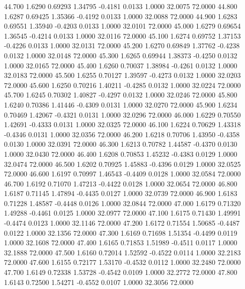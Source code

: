   44.700   1.6290   0.69293   1.34795  -0.4181   0.0133   1.0000  32.0075  72.0000
  44.800   1.6287   0.69425   1.35366  -0.4192   0.0133   1.0000  32.0088  72.0000
  44.900   1.6283   0.69551   1.35940  -0.4203   0.0133   1.0000  32.0101  72.0000
  45.000   1.6279   0.69654   1.36545  -0.4214   0.0133   1.0000  32.0116  72.0000
  45.100   1.6274   0.69752   1.37153  -0.4226   0.0133   1.0000  32.0131  72.0000
  45.200   1.6270   0.69849   1.37762  -0.4238   0.0132   1.0000  32.0148  72.0000
  45.300   1.6265   0.69944   1.38373  -0.4250   0.0132   1.0000  32.0165  72.0000
  45.400   1.6260   0.70037   1.38984  -0.4261   0.0132   1.0000  32.0183  72.0000
  45.500   1.6255   0.70127   1.39597  -0.4273   0.0132   1.0000  32.0203  72.0000
  45.600   1.6250   0.70216   1.40211  -0.4285   0.0132   1.0000  32.0224  72.0000
  45.700   1.6245   0.70302   1.40827  -0.4297   0.0132   1.0000  32.0246  72.0000
  45.800   1.6240   0.70386   1.41446  -0.4309   0.0131   1.0000  32.0270  72.0000
  45.900   1.6234   0.70469   1.42067  -0.4321   0.0131   1.0000  32.0296  72.0000
  46.000   1.6229   0.70550   1.42691  -0.4333   0.0131   1.0000  32.0325  72.0000
  46.100   1.6224   0.70629   1.43318  -0.4346   0.0131   1.0000  32.0356  72.0000
  46.200   1.6218   0.70706   1.43950  -0.4358   0.0130   1.0000  32.0391  72.0000
  46.300   1.6213   0.70782   1.44587  -0.4370   0.0130   1.0000  32.0430  72.0000
  46.400   1.6208   0.70853   1.45232  -0.4383   0.0129   1.0000  32.0474  72.0000
  46.500   1.6202   0.70925   1.45883  -0.4396   0.0129   1.0000  32.0525  72.0000
  46.600   1.6197   0.70997   1.46543  -0.4409   0.0128   1.0000  32.0584  72.0000
  46.700   1.6192   0.71070   1.47213  -0.4422   0.0128   1.0000  32.0654  72.0000
  46.800   1.6187   0.71145   1.47894  -0.4435   0.0127   1.0000  32.0739  72.0000
  46.900   1.6183   0.71228   1.48587  -0.4448   0.0126   1.0000  32.0844  72.0000
  47.000   1.6179   0.71320   1.49288  -0.4461   0.0125   1.0000  32.0977  72.0000
  47.100   1.6175   0.71430   1.49991  -0.4474   0.0123   1.0000  32.1146  72.0000
  47.200   1.6172   0.71554   1.50685  -0.4487   0.0122   1.0000  32.1356  72.0000
  47.300   1.6169   0.71698   1.51354  -0.4499   0.0119   1.0000  32.1608  72.0000
  47.400   1.6165   0.71853   1.51989  -0.4511   0.0117   1.0000  32.1888  72.0000
  47.500   1.6160   0.72014   1.52592  -0.4522   0.0114   1.0000  32.2183  72.0000
  47.600   1.6155   0.72177   1.53170  -0.4532   0.0112   1.0000  32.2480  72.0000
  47.700   1.6149   0.72338   1.53728  -0.4542   0.0109   1.0000  32.2772  72.0000
  47.800   1.6143   0.72500   1.54271  -0.4552   0.0107   1.0000  32.3056  72.0000
